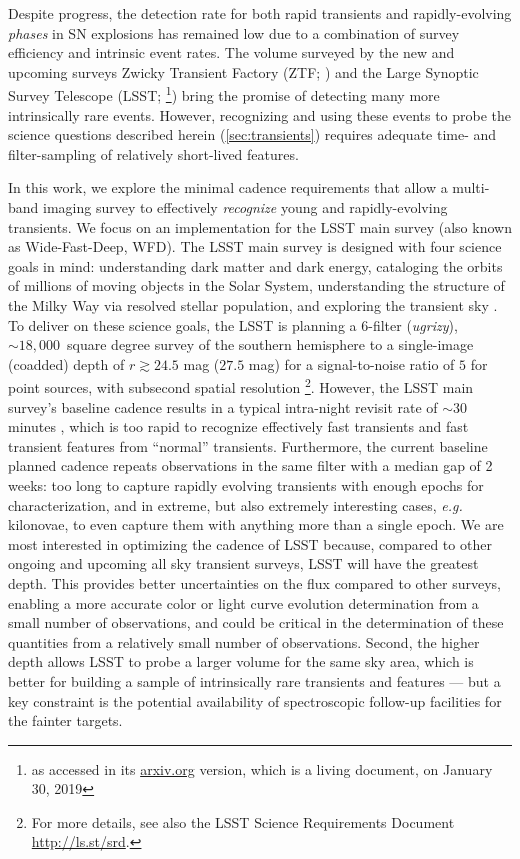 \documentclass[letterpaper,longauthor,trackchanges,twocolumn,onecolappendix,sort&compress]{aastex62}
\begin{document}

Despite progress, the detection rate for both rapid transients and rapidly-evolving \emph{phases} in SN explosions has remained low due to a combination of survey efficiency and intrinsic event rates. The volume surveyed by the new and upcoming surveys Zwicky Transient Factory (ZTF; \citealt{ztf}) and the Large Synoptic Survey Telescope (LSST; \citealt{lsst}\footnote{as accessed in its \url{arxiv.org} version, which is a living document, on January 30, 2019}) bring the promise of detecting many more intrinsically rare events. However, recognizing and using these events to probe the science questions described herein (\autoref{sec:transients}) requires adequate time- and filter-sampling of relatively short-lived features. 

In this work, we explore the minimal cadence requirements that allow a multi-band imaging survey to effectively \emph{recognize} young and rapidly-evolving transients. We focus on an implementation for the LSST main survey (also known as Wide-Fast-Deep, WFD). The LSST main survey is designed with four science goals in mind: understanding dark matter and dark energy, cataloging the orbits of millions of moving objects in the Solar System, understanding the structure of the Milky Way via resolved stellar population, and exploring the transient sky \citep{lsst}. To deliver on these science goals, the LSST is planning a 6-filter (\emph{ugrizy}), $\sim18,000$~square degree survey of the southern hemisphere to a single-image (coadded) depth of $r\gtrsim24.5$ mag ($27.5$ mag) for a signal-to-noise ratio of $5$ for point sources, with subsecond spatial resolution \citep{lsst}\footnote{For more details, see also the LSST Science Requirements Document \url{http://ls.st/srd}.}. However, the LSST main survey's baseline cadence results in a typical intra-night revisit rate of $\sim$30 minutes \citep{COSEP}, which is too rapid to recognize effectively fast transients and fast transient features from ``normal'' transients. Furthermore, the current baseline planned cadence repeats observations in the same filter with a median gap of 2 weeks: too long to capture rapidly evolving transients with enough epochs for characterization, and in extreme, but also extremely interesting cases, \emph{e.g.} kilonovae, to even capture them with anything more than a single epoch. We are most interested in optimizing the cadence of LSST because, compared to other ongoing and upcoming all sky transient surveys, LSST will have the greatest depth. This provides better uncertainties on the flux compared to other surveys, enabling a more accurate color or  light curve evolution determination from a small number of observations, and could be critical in the determination of these quantities from a relatively small number of observations. Second, the higher depth allows LSST to probe a larger volume for the same sky area, which is better for building a sample of intrinsically rare transients and features --- but a key constraint is the potential availability of spectroscopic follow-up facilities for the fainter targets.
\end{document}
